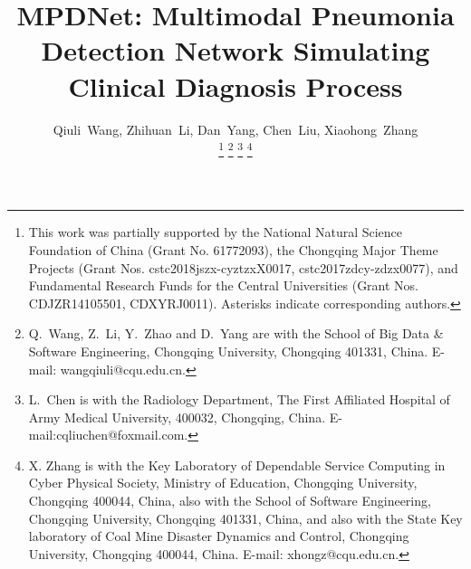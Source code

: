 \documentclass[journal]{IEEEtran}
\begin{document}
%
\title{MPDNet: Multimodal Pneumonia Detection Network Simulating Clinical Diagnosis Process}
%
%
%

\author{Qiuli~Wang,
        Zhihuan~Li,
        Dan~Yang,
        Chen~Liu,
        Xiaohong~Zhang%

\thanks{This work was partially supported by the National Natural Science Foundation of China (Grant No. 61772093), the Chongqing Major Theme Projects (Grant Nos. cstc2018jszx-cyztzxX0017, cstc2017zdcy-zdzx0077), and Fundamental Research Funds for the Central Universities (Grant Nos. CDJZR14105501, CDXYRJ0011). Asterisks indicate corresponding authors.
}
\thanks{Q.~Wang, Z.~Li, Y.~Zhao and D.~Yang are with the School of Big Data \& Software Engineering, Chongqing University, Chongqing 401331, China. E-mail: wangqiuli@cqu.edu.cn.}
\thanks{L.~Chen is with the Radiology Department, The First Affiliated Hospital of Army Medical University, 400032, Chongqing, China. E-mail:cqliuchen@foxmail.com. }
\thanks{X. Zhang is with the Key Laboratory of Dependable Service Computing in Cyber Physical Society, Ministry of Education, Chongqing University, Chongqing 400044, China, also with the School of Software Engineering, Chongqing University, Chongqing 401331, China, and also with the State Key laboratory of Coal Mine Disaster Dynamics and Control, Chongqing University, Chongqing 400044, China. E-mail: xhongz@cqu.edu.cn.}

}
\end{document}
